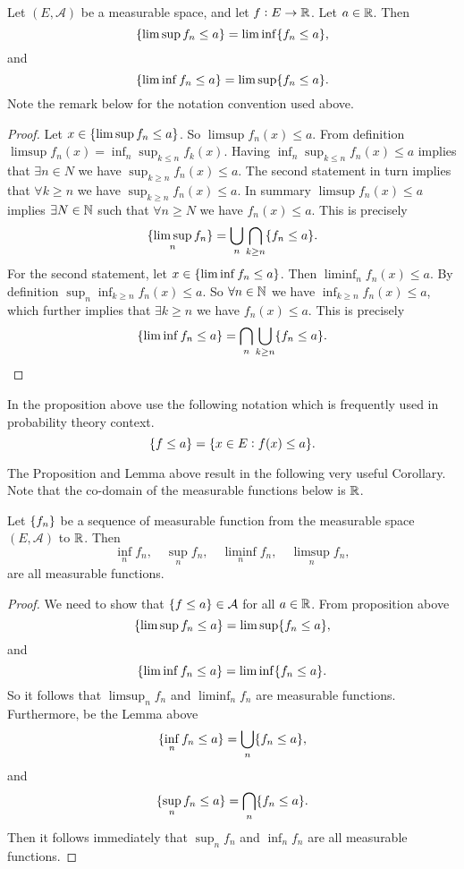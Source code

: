\begin{proposition}
	Let $ (E,\mathcal{A}) $ be a measurable space, and let $ f: E \to \mathbb{R} $. Let $ a \in \mathbb{R} $. Then
	\[ \{\limsup f_n \leq a\} = \liminf \{f_n \leq a\}, \]
	and 
	\[ \{\liminf f_n \leq a\} = \limsup \{f_n \leq a\}. \]
	Note the remark below for the notation convention used above.
\end{proposition}
\begin{proof}
	Let $ x \in \{\limsup f_n \leq a\} $. So $ \limsup f_n(x) \leq a $. From definition $ \limsup f_n(x) = \inf_{n}\sup_{k\leq n} f_k(x) $. Having $ \inf_n \sup_{k\leq n} f_n(x) \leq a $ implies that $ \exists n \in N $ we have $ \sup_{k\geq n} f_n(x) \leq a $. The second statement in turn implies that $ \forall k \geq n  $ we have $ \sup_{k\geq n} f_n(x) \leq a $. In summary $ \limsup f_n(x)\leq a $ implies $ \exists N \in \mathbb{N} $ such that $ \forall n\geq N $ we have $ f_n(x) \leq a $. This is precisely
	\[ \{\limsup_n f_n\} = \bigcup_n \bigcap_{k\geq n} \{f_n \leq a\}. \] 
	For the second statement, let $ x \in \{\liminf f_n \leq a\} $. Then $ \liminf_n f_n(x)\leq a $. By definition $ \sup_{n}\inf_{k\geq n} f_n(x) \leq a $. So $ \forall n \in \mathbb{N} $ we have $ \inf_{k\geq n} f_n(x)\leq a $, which further implies that $ \exists k \geq n $ we have $ f_n(x) \leq a $. This is precisely
	\[ \{\liminf f_n \leq a\} = \bigcap_n \bigcup_{k\geq n} \{f_n \leq a\}.  \] 
\end{proof}


\begin{remark}
	In the proposition above use the following notation which is frequently used in probability theory context.
	\[ \{f \leq a\} = \{x \in E: f(x)\leq a\}. \]
\end{remark}


The Proposition and Lemma above result in the following very useful Corollary. Note that the co-domain of the measurable functions below is $ \mathbb{R} $.

\begin{corollary}
	Let $ \{f_n\} $ be a sequence of measurable function from the measurable space $ (E,\mathcal{A}) $ to $ \mathbb{R} $. Then
	\[ \inf_n f_n,\quad \sup_n f_n,\quad \liminf_n f_n,\quad \limsup_n f_n, \]
	are all measurable functions.
\end{corollary}
\begin{proof}
	We need to show that $ \{f\leq a\} \in \mathcal{A} $ for all $ a\in \mathbb{R} $. From proposition above 
	\[ \{\limsup f_n \leq a\} = \limsup \{f_n \leq a\}, \]
	and 
	\[ \{\liminf f_n \leq a\} = \liminf \{f_n \leq a\}. \]
	So it follows that $ \limsup_n f_n $ and $ \liminf_n f_n $ are measurable functions. Furthermore, be the Lemma above
	\[ \{\inf_n f_n \leq a\} = \bigcup_n \{f_n \leq a\}, \]
	and
	\[ \{\sup_n f_n \leq a\} = \bigcap_n \{f_n \leq a\}. \]
	Then it follows immediately that $ \sup_n f_n $ and $ \inf_n f_n $ are all measurable functions.
\end{proof}

